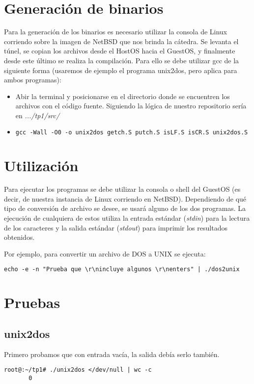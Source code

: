 \documentclass[a4paper,11pt]{article}
\begin{document}
\section{Generaci\'on de binarios}
Para la generaci\'on de los binarios es necesario utilizar la consola de Linux corriendo sobre la imagen de NetBSD que nos brinda la cátedra. Se levanta el túnel, se copian los archivos desde el HostOS hacia el GuestOS, y finalmente desde este último se realiza la compilación. Para ello se debe utilizar gcc de la siguiente forma (usaremos de ejemplo el programa unix2dos, pero aplica para ambos programas):

\begin{itemize}
\item Abir la terminal y posicionarse en el directorio donde se encuentren los archivos con el c\'odigo fuente. Siguiendo la lógica de nuestro repositorio sería en \textit{.../tp1/src/}
\item \begin{verbatim}
gcc -Wall -O0 -o unix2dos getch.S putch.S isLF.S isCR.S unix2dos.S
\end{verbatim} 
\end{itemize}

\section{Utilización}
Para ejecutar los programas se debe utilizar la consola o shell del GuestOS (es decir, de nuestra instancia de Linux corriendo en NetBSD). Dependiendo de qué tipo de conversión de archivo se desee, se usará alguno de los dos programas. La ejecución de cualquiera de estos utiliza la entrada estándar (\textit{stdin}) para la lectura de los caracteres y la salida estándar (\textit{stdout}) para imprimir los resultados obtenidos.

\indent	
Por ejemplo, para convertir un archivo de DOS a UNIX se ejecuta: 

\begin{verbatim}
echo -e -n "Prueba que \r\nincluye algunos \r\nenters" | ./dos2unix 
\end{verbatim}

\section{Pruebas}
\subsection{unix2dos}
Primero probamos que con entrada vac\'ia, la salida deb\'ia serlo tambi\'en.
\begin{verbatim}
root@:~/tp1# ./unix2dos </dev/null | wc -c
       0
\end{verbatim}
\end{document}
